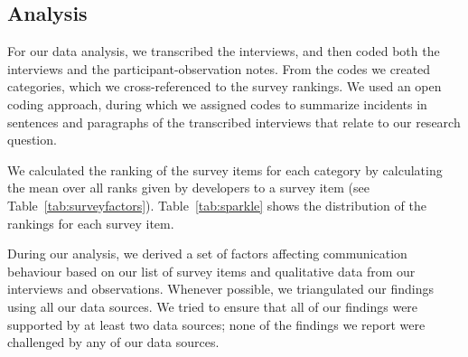 \documentclass[12pt,oneside]{book}
\begin{document}






%

\subsection{Analysis} 
For our data analysis, we transcribed the interviews, and then coded both the interviews and the participant-observation notes. From the codes we created categories, which we cross-referenced to the survey rankings. We used an open coding approach, during which we assigned codes to summarize incidents in sentences and paragraphs of the transcribed interviews that relate to our research question.


We calculated the ranking of the survey items for each category by calculating the mean over all ranks given by developers to a survey item (see Table~\ref{tab:surveyfactors}).
Table~\ref{tab:sparkle} shows the distribution of the rankings for each survey item.

During our analysis, we derived a set of factors affecting communication behaviour based on our list of survey items and qualitative data from our interviews and observations. Whenever possible, we triangulated our findings using all our data sources. We tried to ensure that all of our findings were supported by at least two data sources; none of the findings we report were challenged by any of our data sources. 
\end{document}
